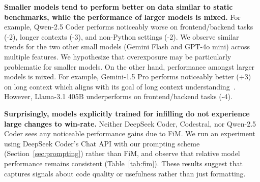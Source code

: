 \textbf{Smaller models tend to perform better on data similar to static benchmarks, while the performance of larger models is mixed.}
For example, Qwen-2.5 Coder performs noticeably worse on frontend/backend tasks (-2), longer contexts (-3), and non-Python settings (-2).
We observe similar trends for the two other small models (Gemini Flash and GPT-4o mini) across multiple features.
We hypothesize that overexposure may be particularly problematic for smaller models.
On the other hand, performance amongst larger models is mixed.
For example, Gemini-1.5 Pro performs noticeably better (+3) on long context which aligns with its goal of long context understanding~\cite{geminiteam2024}.
However, Llama-3.1 405B underperforms on frontend/backend tasks (-4).


\textbf{Surprisingly, models explicitly trained for infilling do not experience large changes to win-rate.} 
Neither DeepSeek Coder, Codestral, nor Qwen-2.5 Coder sees any noticeable performance gains due to FiM. 
We run an experiment using DeepSeek Coder's Chat API with our prompting scheme (Section~\ref{sec:prompting}) rather than FiM, and observe that relative model performance remains consistent (Table~\ref{tab:fim}).
These results suggest that \systemName captures signals about code quality or usefulness rather than just formatting.





















